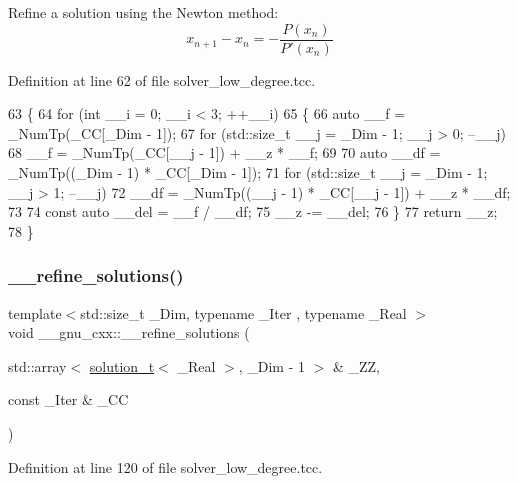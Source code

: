 Refine a solution using the Newton method\+: \[ x_{n+1} - x_n = -\frac{P(x_n)}{P'(x_n)} \] 

Definition at line 62 of file solver\+\_\+low\+\_\+degree.\+tcc.


\begin{DoxyCode}
63     \{
64       \textcolor{keywordflow}{for} (\textcolor{keywordtype}{int} \_\_i = 0; \_\_i < 3; ++\_\_i)
65         \{
66           \textcolor{keyword}{auto} \_\_f = \_NumTp(\_CC[\_Dim - 1]);
67           \textcolor{keywordflow}{for} (std::size\_t \_\_j = \_Dim - 1; \_\_j > 0; --\_\_j)
68             \_\_f = \_NumTp(\_CC[\_\_j - 1]) + \_\_z * \_\_f;
69 
70           \textcolor{keyword}{auto} \_\_df = \_NumTp((\_Dim - 1) * \_CC[\_Dim - 1]);
71           \textcolor{keywordflow}{for} (std::size\_t \_\_j = \_Dim - 1; \_\_j > 1; --\_\_j)
72             \_\_df = \_NumTp((\_\_j - 1) * \_CC[\_\_j - 1]) + \_\_z * \_\_df;
73 
74           \textcolor{keyword}{const} \textcolor{keyword}{auto} \_\_del = \_\_f / \_\_df;
75           \_\_z -= \_\_del;
76         \}
77       \textcolor{keywordflow}{return} \_\_z;
78     \}
\end{DoxyCode}
\mbox{\label{namespace____gnu__cxx_aa8dd4c7542667cc5a8e435ca53d6fad7}} 
\subsubsection{\texorpdfstring{\+\_\+\+\_\+refine\+\_\+solutions()}{\_\_refine\_solutions()}}
{\footnotesize\ttfamily template$<$std\+::size\+\_\+t \+\_\+\+Dim, typename \+\_\+\+Iter , typename \+\_\+\+Real $>$ \\
void \+\_\+\+\_\+gnu\+\_\+cxx\+::\+\_\+\+\_\+refine\+\_\+solutions (\begin{DoxyParamCaption}\item[{std\+::array$<$ \hyperlink{namespace____gnu__cxx_ae20ea642de50eb361074c62676b0159c}{solution\+\_\+t}$<$ \+\_\+\+Real $>$, \+\_\+\+Dim -\/ 1 $>$ \&}]{\+\_\+\+ZZ,  }\item[{const \+\_\+\+Iter \&}]{\+\_\+\+CC }\end{DoxyParamCaption})}



Definition at line 120 of file solver\+\_\+low\+\_\+degree.\+tcc.



